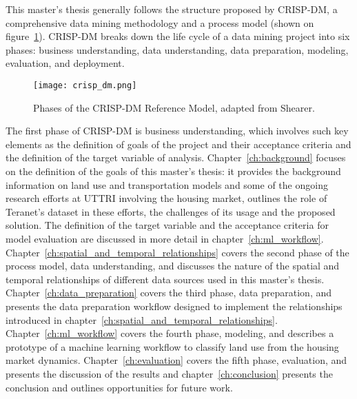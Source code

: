 This master's thesis generally follows the structure proposed by CRISP-DM, a comprehensive data mining methodology and a process model\cite{Shearer2000} (shown on figure~\ref{fig:crisp_dm}).
CRISP-DM breaks down the life cycle of a data mining project into six phases: business understanding, data understanding, data preparation, modeling, evaluation, and deployment.

\begin{figure}[hbt!]
    \centering
    \texttt{[image: crisp\_dm.png]}
    \caption{Phases of the CRISP-DM Reference Model, adapted from Shearer\cite{Shearer2000}.}
    \label{fig:crisp_dm}
\end{figure}

The first phase of CRISP-DM is business understanding, which involves such key elements as the definition of goals of the project and their acceptance criteria and the definition of the target variable of analysis\cite{Nisbet2018}.
Chapter~\ref{ch:background} focuses on the definition of the goals of this master's thesis: it provides the background information on land use and transportation models and some of the ongoing research efforts at UTTRI involving the housing market, outlines the role of Teranet's dataset in these efforts, the challenges of its usage and the proposed solution.
The definition of the target variable and the acceptance criteria for model evaluation are discussed in more detail in chapter~\ref{ch:ml_workflow}.
Chapter~\ref{ch:spatial_and_temporal_relationships} covers the second phase of the process model, data understanding, and discusses the nature of the spatial and temporal relationships of different data sources used in this master's thesis.
Chapter~\ref{ch:data_preparation} covers the third phase, data preparation, and presents the data preparation workflow designed to implement the relationships introduced in chapter~\ref{ch:spatial_and_temporal_relationships}.
Chapter~\ref{ch:ml_workflow} covers the fourth phase, modeling, and describes a prototype of a machine learning workflow to classify land use from the housing market dynamics.
Chapter~\ref{ch:evaluation} covers the fifth phase, evaluation, and presents the discussion of the results and chapter~\ref{ch:conclusion} presents the conclusion and outlines opportunities for future work.